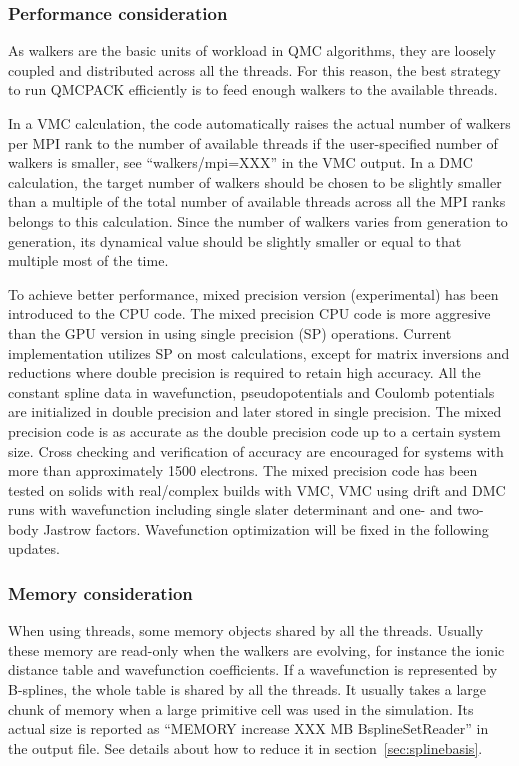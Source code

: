 \subsubsection{Performance consideration}
\label{sec:cpu:performance}
As walkers are the basic units of workload in QMC algorithms, they are loosely coupled and distributed across all the threads. For this reason, the best strategy to run QMCPACK efficiently is to feed enough walkers to the available threads.

In a VMC calculation, the code automatically raises the actual number of walkers per MPI rank to the number of available threads if the user-specified number of walkers is smaller, see ``walkers/mpi=XXX'' in the VMC output.
In a DMC calculation, the target number of walkers should be chosen to be slightly smaller than a multiple of the total number of available threads across all the MPI ranks belongs to this calculation. Since the number of walkers varies from generation to generation, its dynamical value should be slightly smaller or equal to that multiple most of the time.

To achieve better performance, mixed precision version (experimental) has been introduced to the CPU code. The mixed precision CPU code is more aggresive than the GPU version in using single precision (SP) operations. Current implementation utilizes SP on most calculations, except for matrix inversions and reductions where double precision is required to retain high accuracy. All the constant spline data in wavefunction, pseudopotentials and Coulomb potentials are initialized in double precision and later stored in single precision. The mixed precision code is as accurate as the double precision code up to a certain system size. Cross checking and verification of accuracy are encouraged for systems with more than approximately 1500 electrons. The mixed precision code has been tested on solids with real/complex builds with VMC, VMC using drift and DMC runs with wavefunction including single slater determinant and one- and two-body Jastrow factors. Wavefunction optimization will be fixed in the following updates.

\subsubsection{Memory consideration}
When using threads, some memory objects shared by all the threads. Usually these memory are read-only when the walkers are evolving, for instance the ionic distance table and wavefunction coefficients.
If a wavefunction is represented by B-splines, the whole table is shared by all the threads. It usually takes a large chunk of memory when a large primitive cell was used in the simulation. Its actual size is reported as ``MEMORY increase XXX MB BsplineSetReader'' in the output file.
See details about how to reduce it in section~\ref{sec:splinebasis}.

